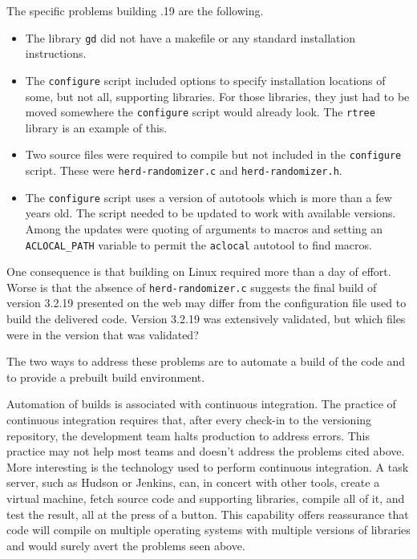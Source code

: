 \documentclass{article}
\begin{document}
The specific problems building .19 are the following.
\begin{itemize}
  \item The library \texttt{gd} did not have a makefile or
        any standard installation instructions.
  \item The \texttt{configure} script included options to specify
        installation locations of some, but not all, supporting
        libraries. For those libraries, they just had to be moved
        somewhere the \texttt{configure} script would already look.
        The \texttt{rtree} library is an example of this.
  \item Two source files were required to compile but not included
        in the \texttt{configure} script. These were 
        \texttt{herd-randomizer.c} and \texttt{herd-randomizer.h}.
  \item The \texttt{configure} script uses a version of autotools
        which is more than a few years old. The script needed to
        be updated to work with available versions.
        Among the updates were quoting of arguments to macros
        and setting an \texttt{ACLOCAL\_PATH} variable to
        permit the \texttt{aclocal} autotool to find macros.
\end{itemize}
One consequence is that building \naadsm
on Linux required more than a day of effort. Worse is that
the absence of \texttt{herd-randomizer.c} suggests the final build
of version 3.2.19 presented on the web may differ from the
configuration file used to build the delivered code. Version 3.2.19
was extensively validated, but which files were in the version
that was validated?

The two ways to address these problems are to automate a build
of the code and to provide a prebuilt build environment.

Automation of builds is associated with continuous integration.
The practice of continuous integration requires that, after every
check-in to the versioning repository, the development team
halts production to address errors. This practice may not help
most teams and doesn't address the problems cited above. More
interesting is the technology used to perform continuous
integration. A task server, such as Hudson or Jenkins,
can, in concert with other tools, create a virtual machine,
fetch source code and supporting libraries, compile all of it,
and test the result, all at the press of a button. This capability
offers reassurance that code will compile on multiple operating
systems with multiple versions of libraries and would surely
avert the problems seen above.
\end{document}
